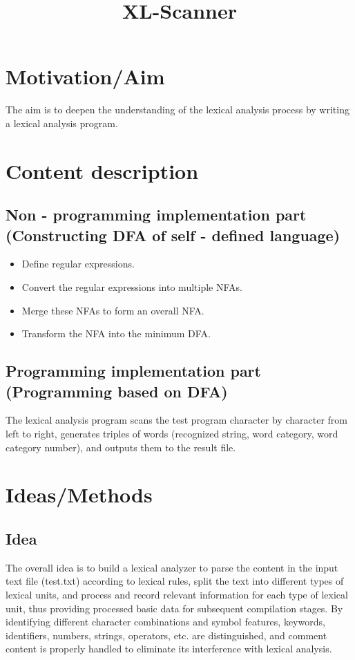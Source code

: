 \documentclass[a4paper,12pt]{article}
\title{XL-Scanner}\date{}
\begin{document}
 
\tableofcontents
\newpage
\maketitle



\section{Motivation/Aim}
The aim is to deepen the understanding of the lexical analysis process by writing a lexical analysis program.

\section{Content description}
\subsection{Non - programming implementation part (Constructing DFA of self - defined language)}
\begin{itemize}
    \item Define regular expressions.
    \item Convert the regular expressions into multiple NFAs.
    \item Merge these NFAs to form an overall NFA.
    \item Transform the NFA into the minimum DFA.
\end{itemize}
\subsection{Programming implementation part (Programming based on DFA)}
The lexical analysis program scans the test program character by character from left to right, generates triples of words (recognized string, word category, word category number), and outputs them to the result file. 

\section{Ideas/Methods}
\subsection{Idea}
The overall idea is to build a lexical analyzer to parse the content in the input text file (test.txt) according to lexical rules, split the text into different types of lexical units, and process and record relevant information for each type of lexical unit, thus providing processed basic data for subsequent compilation stages. By identifying different character combinations and symbol features, keywords, identifiers, numbers, strings, operators, etc. are distinguished, and comment content is properly handled to eliminate its interference with lexical analysis.
\end{document}
